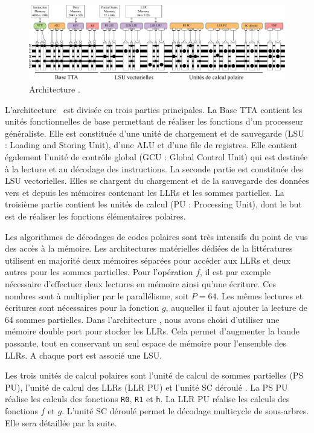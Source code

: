 \begin{figure}[t]
	\centering
	\includegraphics[width=\textwidth]{main/ch4_fig/archi_sc}
	\caption{Architecture \TTSC.}
	\label{fig:prode}
\end{figure}

L'architecture \TTSC~est divisée en trois parties principales. La Base TTA contient les unités fonctionnelles de base permettant de réaliser les fonctions d'un processeur généraliste. Elle est constituée d'une unité de chargement et de sauvegarde (LSU : Loading and Storing Unit), d'une ALU et d'une file de registres. Elle contient également l'unité de contrôle global (GCU : Global Control Unit) qui est destinée à la lecture et au décodage des instructions. La seconde partie est constituée des LSU vectorielles. Elles se chargent du chargement et de la sauvegarde des données vers et depuis les mémoires contenant les LLRs et les sommes partielles.
La troisième partie contient les unités de calcul (PU : Processing Unit), dont le but est de réaliser les fonctions élémentaires polaires.

Les algorithmes de décodages de codes polaires sont très intensifs du point de vus des accès à la mémoire. Les architectures matérielles dédiées de la littératures utilisent en majorité deux mémoires séparées pour accéder aux LLRs et deux autres pour les sommes partielles. Pour l'opération $f$, il est par exemple nécessaire d'effectuer deux lectures en mémoire ainsi qu'une écriture. Ces nombres sont à multiplier par le parallélisme, soit $P=64$. Les mêmes lectures et écritures sont nécessaires pour la fonction $g$, auquelles il faut ajouter la lecture de 64 sommes partielles. Dans l'architecture \TTSC, nous avons choisi d'utiliser une mémoire double port pour stocker les LLRs. Cela permet d'augmenter la bande passante, tout en conservant un seul espace de mémoire pour l'ensemble des LLRs. A chaque port est associé une LSU.

Les trois unités de calcul polaires sont l'unité de calcul de sommes partielles (PS PU), l'unité de calcul des LLRs (LLR PU) et l'unité \og SC déroulé \fg. La PS PU réalise les calculs des fonctions \texttt{R0}, \texttt{R1} et \texttt{h}. La LLR PU réalise les calculs des fonctions $f$ et $g$. L'unité \og SC déroulé \fg permet le décodage multicycle de sous-arbres. Elle sera détaillée par la suite. 

